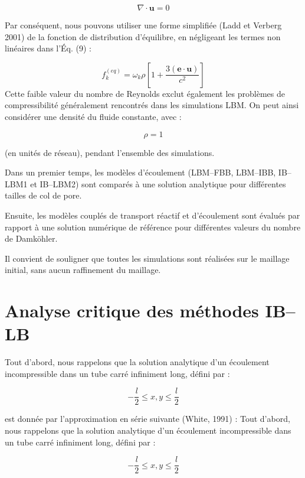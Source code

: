 \documentclass[12pt,a4paper]{report}
\begin{document}
\begin{equation}
\nabla \cdot \mathbf{u} = 0 \tag{62}
\end{equation}

Par conséquent, nous pouvons utiliser une forme simplifiée (Ladd et Verberg 2001) de la fonction de distribution d'équilibre, en négligeant les termes non linéaires dans l'Éq. (9) :

\begin{equation}
f_k^{(eq)} = \omega_k \rho \left[1 + \frac{3(\mathbf{e} \cdot \mathbf{u})}{c^2}\right] \tag{63}
\end{equation}
Cette faible valeur du nombre de Reynolds exclut également les problèmes de compressibilité généralement rencontrés dans les simulations LBM. On peut ainsi considérer une densité du fluide constante, avec :

\begin{equation}
\rho = 1
\end{equation}

(en unités de réseau), pendant l’ensemble des simulations.

Dans un premier temps, les modèles d’écoulement (LBM--FBB, LBM--IBB, IB--LBM1 et IB--LBM2) sont comparés à une solution analytique pour différentes tailles de col de pore.

Ensuite, les modèles couplés de transport réactif et d’écoulement sont évalués par rapport à une solution numérique de référence pour différentes valeurs du nombre de Damköhler.

Il convient de souligner que toutes les simulations sont réalisées sur le maillage initial, sans aucun raffinement du maillage.
\section{Analyse critique des méthodes IB–LB}
Tout d’abord, nous rappelons que la solution analytique d’un écoulement incompressible dans un tube carré infiniment long, défini par :

\begin{equation}
-\frac{l}{2} \leq x,y \leq \frac{l}{2}
\end{equation}

est donnée par l’approximation en série suivante (White, 1991) :
Tout d’abord, nous rappelons que la solution analytique d’un écoulement incompressible dans un tube carré infiniment long, défini par :

\begin{equation}
-\frac{l}{2} \leq x,y \leq \frac{l}{2}
\end{equation}
\end{document}
